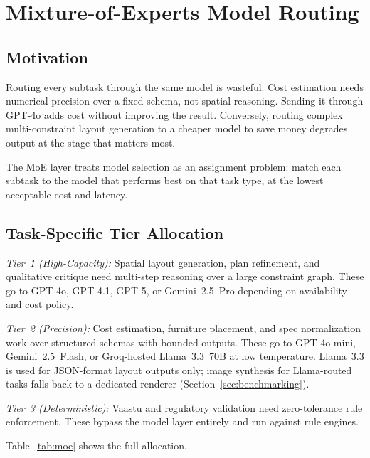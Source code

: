 \documentclass[journal]{IEEEtran}
\begin{document}
\section{Mixture-of-Experts Model Routing}
\label{sec:moe}

\subsection{Motivation}

Routing every subtask through the same model is wasteful. Cost estimation
needs numerical precision over a fixed schema, not spatial reasoning. Sending
it through GPT-4o adds cost without improving the result. Conversely, routing
complex multi-constraint layout generation to a cheaper model to save money
degrades output at the stage that matters most.

The MoE layer treats model selection as an assignment problem: match each
subtask to the model that performs best on that task type, at the lowest
acceptable cost and latency.

\subsection{Task-Specific Tier Allocation}

\textit{Tier~1 (High-Capacity):} Spatial layout generation, plan refinement,
and qualitative critique need multi-step reasoning over a large constraint
graph. These go to GPT-4o, GPT-4.1, GPT-5, or Gemini~2.5~Pro depending on
availability and cost policy.

\textit{Tier~2 (Precision):} Cost estimation, furniture placement, and spec
normalization work over structured schemas with bounded outputs. These go to
GPT-4o-mini, Gemini~2.5~Flash, or Groq-hosted Llama~3.3~70B at low
temperature. Llama~3.3 is used for JSON-format layout outputs only; image
synthesis for Llama-routed tasks falls back to a dedicated renderer
(Section~\ref{sec:benchmarking}).

\textit{Tier~3 (Deterministic):} Vaastu and regulatory validation need
zero-tolerance rule enforcement. These bypass the model layer entirely and
run against rule engines.

Table~\ref{tab:moe} shows the full allocation.
\end{document}
